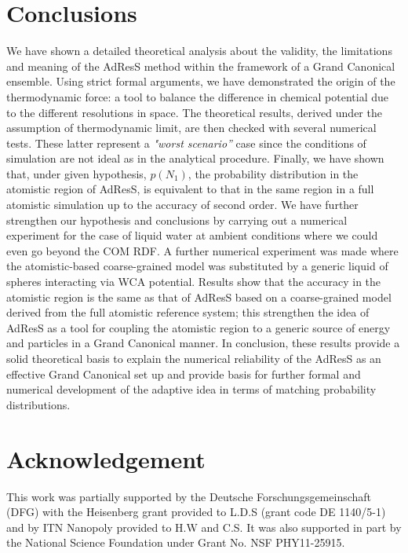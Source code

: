 \documentclass[aip,jcp,a4paper,reprint,onecolumn]{revtex4-1}
\begin{document}
\section{Conclusions}
We have shown a detailed theoretical analysis about the validity, the limitations and meaning of the AdResS method within the framework of a Grand Canonical ensemble.
Using strict formal arguments, we have demonstrated the origin of the thermodynamic force: a tool to balance the difference in chemical potential due to the different resolutions in space.
  The theoretical results, derived under the assumption of thermodynamic limit, are then checked with several numerical tests. These latter represent a {\it "worst scenario''} case since the conditions of simulation are not ideal as in the analytical procedure.
Finally, we have shown that, under given hypothesis, $p(N_{1})$, the probability distribution in the atomistic region of AdResS, is equivalent to that in the same region in a full atomistic simulation up to the accuracy of second order. We have further strengthen our hypothesis and conclusions by carrying out a numerical experiment for the case of liquid water at ambient conditions where we could even go beyond the COM RDF. 
A further numerical experiment was made where the atomistic-based coarse-grained model was substituted by a generic liquid of spheres interacting via WCA potential. Results show that the accuracy in the atomistic region is the same as that of AdResS based on a coarse-grained model derived from the full atomistic reference system; this strengthen the idea of AdResS as a tool for coupling the atomistic region to a generic source of energy and particles in a Grand Canonical manner.
In conclusion, these results provide a solid theoretical basis to explain the numerical reliability of the AdResS as an effective Grand Canonical set up and provide basis for further formal and numerical development of the adaptive idea in terms of matching probability distributions.


\section*{Acknowledgement}
This work was partially supported by the Deutsche Forschungsgemeinschaft (DFG) with the Heisenberg grant provided to L.D.S (grant code DE 1140/5-1) and by ITN Nanopoly provided to H.W and C.S.
It was also supported in part by the National Science Foundation under Grant No. NSF PHY11-25915.
\end{document}
